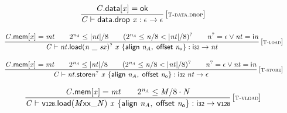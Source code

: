$$
\begin{array}{@{}c@{}}\displaystyle
\frac{
{\mathit{C}}.\mathsf{data}{}[{\mathit{x}}] = \mathsf{ok}
}{
{\mathit{C}} \vdash \mathsf{data.drop}~{\mathit{x}} : \epsilon \rightarrow \epsilon
} \, {[\textsc{\scriptsize T{-}data.drop}]}
\qquad
\end{array}
$$

$$
\begin{array}{@{}c@{}}\displaystyle
\frac{
{\mathit{C}}.\mathsf{mem}{}[{\mathit{x}}] = {\mathit{mt}}
 \qquad
{2^{{\mathit{n}}_{{\mathit{A}}}}} \leq {|{\mathit{nt}}|} / 8
 \qquad
({2^{{\mathit{n}}_{{\mathit{A}}}}} \leq {\mathit{n}} / 8 < {|{\mathit{nt}}|} / 8)^?
 \qquad
{{\mathit{n}}^?} = \epsilon \lor {\mathit{nt}} = {\mathsf{i}}{{\mathit{n}}}
}{
{\mathit{C}} \vdash {{\mathit{nt}}.\mathsf{load}}{{({\mathit{n}}~\mathsf{\_}~{\mathit{sx}})^?}}~{\mathit{x}}~\{ \begin{array}[t]{@{}l@{}}
\mathsf{align}~{\mathit{n}}_{{\mathit{A}}},\; \mathsf{offset}~{\mathit{n}}_{{\mathsf{o}}} \}\end{array} : \mathsf{i{\scriptstyle32}} \rightarrow {\mathit{nt}}
} \, {[\textsc{\scriptsize T{-}load}]}
\qquad
\end{array}
$$

$$
\begin{array}{@{}c@{}}\displaystyle
\frac{
{\mathit{C}}.\mathsf{mem}{}[{\mathit{x}}] = {\mathit{mt}}
 \qquad
{2^{{\mathit{n}}_{{\mathit{A}}}}} \leq {|{\mathit{nt}}|} / 8
 \qquad
({2^{{\mathit{n}}_{{\mathit{A}}}}} \leq {\mathit{n}} / 8 < {|{\mathit{nt}}|} / 8)^?
 \qquad
{{\mathit{n}}^?} = \epsilon \lor {\mathit{nt}} = {\mathsf{i}}{{\mathit{n}}}
}{
{\mathit{C}} \vdash {{\mathit{nt}}.\mathsf{store}}{{{\mathit{n}}^?}}~{\mathit{x}}~\{ \begin{array}[t]{@{}l@{}}
\mathsf{align}~{\mathit{n}}_{{\mathit{A}}},\; \mathsf{offset}~{\mathit{n}}_{{\mathsf{o}}} \}\end{array} : \mathsf{i{\scriptstyle32}}~{\mathit{nt}} \rightarrow \epsilon
} \, {[\textsc{\scriptsize T{-}store}]}
\qquad
\end{array}
$$

$$
\begin{array}{@{}c@{}}\displaystyle
\frac{
{\mathit{C}}.\mathsf{mem}{}[{\mathit{x}}] = {\mathit{mt}}
 \qquad
{2^{{\mathit{n}}_{{\mathit{A}}}}} \leq {\mathit{M}} / 8 \cdot {\mathit{N}}
}{
{\mathit{C}} \vdash {\mathsf{v{\scriptstyle128}.load}}{({{{{{\mathit{M}}}{\mathsf{x}}}{\mathsf{x}}}{\mathsf{\_}}}{{\mathit{N}}})}~{\mathit{x}}~\{ \begin{array}[t]{@{}l@{}}
\mathsf{align}~{\mathit{n}}_{{\mathit{A}}},\; \mathsf{offset}~{\mathit{n}}_{{\mathsf{o}}} \}\end{array} : \mathsf{i{\scriptstyle32}} \rightarrow \mathsf{v{\scriptstyle128}}
} \, {[\textsc{\scriptsize T{-}vload}]}
\qquad
\end{array}
$$

